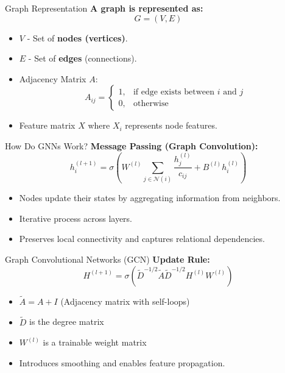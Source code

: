 \documentclass{beamer}
\begin{document}
\begin{frame}{Graph Representation}
    \textbf{A graph is represented as:}
    \[ G = (V, E) \]
    \begin{itemize}
        \item \( V \) - Set of \textbf{nodes (vertices)}.
        \item \( E \) - Set of \textbf{edges} (connections).
        \item Adjacency Matrix \( A \):
        \[ A_{ij} = \begin{cases} 1, & \text{if edge exists between } i \text{ and } j \\ 0, & \text{otherwise} \end{cases} \]
        \item Feature matrix \( X \) where \( X_i \) represents node features.
    \end{itemize}
\end{frame}

\begin{frame}{How Do GNNs Work?}
    \textbf{Message Passing (Graph Convolution):}
    \[ h_i^{(l+1)} = \sigma \left( W^{(l)} \sum_{j \in \mathcal{N}(i)} \frac{h_j^{(l)}}{c_{ij}} + B^{(l)} h_i^{(l)} \right) \]
    \begin{itemize}
        \item Nodes update their states by aggregating information from neighbors.
        \item Iterative process across layers.
        \item Preserves local connectivity and captures relational dependencies.
    \end{itemize}
\end{frame}

\begin{frame}{Graph Convolutional Networks (GCN)}
    \textbf{Update Rule:}
    \[ H^{(l+1)} = \sigma \left( \tilde{D}^{-1/2} \tilde{A} \tilde{D}^{-1/2} H^{(l)} W^{(l)} \right) \]
    \begin{itemize}
        \item \( \tilde{A} = A + I \) (Adjacency matrix with self-loops)
        \item \( \tilde{D} \) is the degree matrix
        \item \( W^{(l)} \) is a trainable weight matrix
        \item Introduces smoothing and enables feature propagation.
    \end{itemize}
\end{frame}
\end{document}

